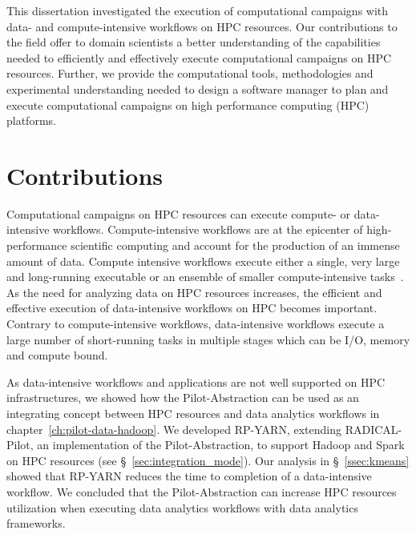 
This dissertation investigated the execution of computational campaigns with
data- and compute-intensive workflows on HPC resources. Our contributions to the
field offer to domain scientists a better understanding of the capabilities
needed to efficiently and effectively execute computational campaigns on HPC
resources. Further, we provide the computational tools, methodologies and
experimental understanding needed to design a software manager to plan and
execute computational campaigns on high performance computing (HPC)
platforms.

\section{Contributions}

Computational campaigns on HPC resources can execute compute- or data- intensive
workflows. Compute-intensive workflows are at the epicenter of high-performance
scientific computing and account for the production of an immense amount of
data. Compute intensive workflows execute either a single, very large and
long-running executable or an ensemble of smaller compute-intensive
tasks~\cite{balasubramanian2018harnessing}. As the need for analyzing data on
HPC resources increases, the efficient and effective execution of data-intensive
workflows on HPC becomes important. Contrary to compute-intensive workflows,
data-intensive workflows execute a large number of short-running tasks in
multiple stages which can be I/O, memory and compute bound.

As data-intensive workflows and applications are not well supported on HPC
infrastructures, we showed how the Pilot-Abstraction can be used as an
integrating concept between HPC resources and data analytics workflows in
chapter~\ref{ch:pilot-data-hadoop}. We developed RP-YARN, extending
RADICAL-Pilot, an implementation of the Pilot-Abstraction, to support Hadoop and
Spark on HPC resources (see \S~\ref{sec:integration_mode}). Our analysis in
\S~\ref{ssec:kmeans} showed that RP-YARN reduces the time to completion of a
data-intensive workflow. We concluded that the Pilot-Abstraction can increase
HPC resources utilization when executing data analytics workflows with data 
analytics frameworks.

